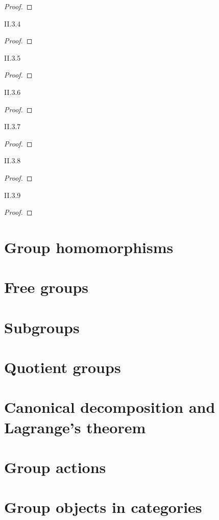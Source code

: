 \begin{proof}
\end{proof}

\begin{exercise}{II.3.4}
\end{exercise}

\begin{proof}
\end{proof}

\begin{exercise}{II.3.5}
\end{exercise}

\begin{proof}
\end{proof}

\begin{exercise}{II.3.6}
\end{exercise}

\begin{proof}
\end{proof}

\begin{exercise}{II.3.7}
\end{exercise}

\begin{proof}
\end{proof}

\begin{exercise}{II.3.8}
\end{exercise}

\begin{proof}
\end{proof}

\begin{exercise}{II.3.9}
\end{exercise}

\begin{proof}
\end{proof}

\section{Group homomorphisms}

\section{Free groups}

\section{Subgroups}

\section{Quotient groups}

\section{Canonical decomposition and Lagrange's theorem}

\section{Group actions}

\section{Group objects in categories}
